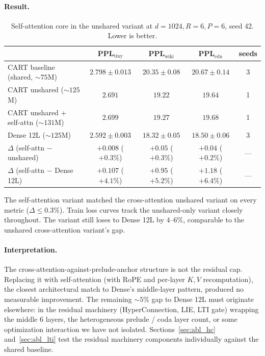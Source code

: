 \documentclass{article}
\newcommand{\cart}{\textsc{CART}}
\newcommand{\pplwiki}{PPL$_\text{wiki}$}
\newcommand{\ppltiny}{PPL$_\text{tiny}$}
\newcommand{\ppledu}{PPL$_\text{edu}$}
\begin{document}
\paragraph{Result.}

\begin{table}[htbp]
\centering
\caption{Self-attention core in the unshared variant at $d{=}1024, R{=}6, P{=}6$, seed 42. Lower is better.}
\label{tab:abl_selfattn}
\footnotesize
\begin{tabular}{lcccc}
\toprule
 & \ppltiny & \pplwiki & \ppledu & seeds \\
\midrule
\cart{} baseline (shared, $\sim 75$M)         & $2.798 \pm 0.013$ & $20.35 \pm 0.08$ & $20.67 \pm 0.14$ & 3 \\
\cart{} unshared ($\sim 125$M)                & $2.691$           & $19.22$          & $19.64$          & 1 \\
\cart{} unshared + self-attn ($\sim 131$M)    & $2.699$           & $19.27$          & $19.68$          & 1 \\
Dense 12L ($\sim 125$M)                       & $2.592 \pm 0.003$ & $18.32 \pm 0.05$ & $18.50 \pm 0.06$ & 3 \\
\midrule
$\Delta$ (self-attn $-$ unshared)             & $+0.008$ ($+0.3\%$) & $+0.05$ ($+0.3\%$) & $+0.04$ ($+0.2\%$) & --- \\
$\Delta$ (self-attn $-$ Dense 12L)            & $+0.107$ ($+4.1\%$) & $+0.95$ ($+5.2\%$) & $+1.18$ ($+6.4\%$) & --- \\
\bottomrule
\end{tabular}
\end{table}

The self-attention variant matched the cross-attention unshared variant on every metric ($\Delta \leq 0.3\%$). Train loss curves track the unshared-only variant closely throughout. The variant still loses to Dense 12L by $4$--$6\%$, comparable to the unshared cross-attention variant's gap.

\paragraph{Interpretation.}
The cross-attention-against-prelude-anchor structure is not the residual cap. Replacing it with self-attention (with RoPE and per-layer $K, V$ recomputation), the closest architectural match to Dense's middle-layer pattern, produced no measurable improvement. The remaining $\sim 5\%$ gap to Dense 12L must originate elsewhere: in the residual machinery (HyperConnection, LIE, LTI gate) wrapping the middle 6 layers, the heterogeneous prelude / coda layer count, or some optimization interaction we have not isolated. Sections~\ref{sec:abl_hc} and~\ref{sec:abl_lti} test the residual machinery components individually against the shared baseline.
\end{document}
